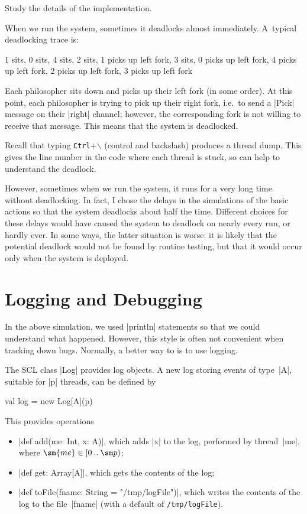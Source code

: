 \begin{instruction}
Study the details of the implementation.
\end{instruction}

When we run the system, sometimes it deadlocks almost
immediately.  A~typical deadlocking trace is:
%
\begin{scala}
1 sits,  0 sits,  4 sits,  2 sits,  1 picks up left fork, 3 sits,  0 picks up left fork,  
4 picks up left fork, 2 picks up left fork,  3 picks up left fork
\end{scala}
%
Each philosopher sits down and picks up their left fork (in some order).  At
this point, each philosopher is trying to pick up their right fork, i.e.~to
send a |Pick| message on their |right| channel; however, the corresponding
fork is not willing to receive that message.  This means that the system is
deadlocked.

Recall that typing \texttt{Ctrl}+$\backslash$ (control and backslash) produces
a thread dump.  This gives the line number in the code where each thread is
stuck, so can help to understand the deadlock.

However, sometimes when we run the system, it runs for a very long time
without deadlocking.  In fact, I chose the delays in the simulations of the
basic actions so that the system deadlocks about half the time.  Different
choices for these delays would have caused the system to deadlock on nearly
every run, or hardly ever.  In some ways, the latter situation is worse: it is
likely that the potential deadlock would not be found by routine testing, but
that it would occur only when the system is deployed.


\section{Logging and Debugging}

In the above simulation, we used |println| statements so that we could
understand what happened.  However, this style is often not convenient when
tracking down bugs.  Normally, a better way to is to use logging.

The SCL class |Log| provides log objects.
%
A new log storing events of type~|A|, suitable for |p| threads,
can be defined by
\begin{scala}
  val log = new Log[A](p)
\end{scala}
%
This provides operations
%
\begin{itemize}
\item |def add(me: Int, x: A)|, which adds |x| to the log, performed by
  thread~|me|, where $\sm{me} \in \interval{0}{\sm p}$;

\item |def get: Array[A]|, which gets the contents of the log;

\item |def toFile(fname: String = "/tmp/logFile")|, which writes the contents
  of the log to the file~|fname| (with a default of \texttt{/tmp/logFile}).
\end{itemize}

